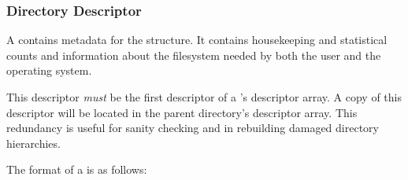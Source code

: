 \subsubsection{Directory Descriptor}
\label{sec:fs-dirdesc}

A  contains metadata for the  structure. It contains
housekeeping and statistical counts and information about the filesystem needed
by both the user and the operating system.

This descriptor {\em must\/} be the first descriptor of a 's
descriptor array.  A copy of this
\gls{descriptor} will be located in the parent directory's descriptor
array. This redundancy is useful for sanity checking and in rebuilding damaged
directory hierarchies.

The format of a  is as follows:

